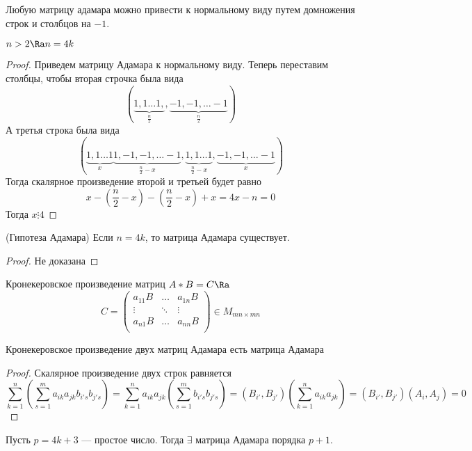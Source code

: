 \begin{note}
    Любую матрицу адамара можно привести к нормальному виду путем домножения строк и столбцов на \(-1\).
\end{note}
\begin{theorem}
    \(n > 2 \Ra n = 4k\)
\end{theorem}
\begin{proof}
    Приведем матрицу Адамара к нормальному виду. Теперь переставим столбцы, чтобы вторая строчка была вида
    \[(\underbrace{1, 1 \dots 1,}_{\frac{n}{2}}, \underbrace{-1, -1, \dots -1}_{\frac{n}{2}} )\]
    А третья строка была вида
    \[(\underbrace{1, 1 \dots 1}_{x}  \underbrace{1, -1, -1, \dots -1}_{\frac{n}{2} - x}, \underbrace{1, 1 \dots 1}_{\frac{n}{2} - x},  \underbrace{-1, -1, \dots -1}_{x} )\]
    Тогда скалярное произведение второй и третьей будет равно 
    \[x - \left(\frac{n}{2} - x\right) - \left(\frac{n}{2} - x\right) + x = 4x - n = 0\]
    Тогда \(x \vdots 4\)
\end{proof}
\begin{theorem}(Гипотеза Адамара)
    Если \(n = 4k\), то матрица Адамара существует.
\end{theorem}
\begin{proof}
    Не доказана
\end{proof}
\begin{definition}
    Кронекеровское произведение матриц \(A * B = C \Ra\)
    \[C = \left(\begin{array}{ccc}
        a_{11}B & \dots & a_{1n}B \\ 
        \vdots & \ddots & \vdots \\ 
        a_{n1}B & \dots & a_{nn}B \\ 
    \end{array}\right) \in M_{mn \times mn}\]
\end{definition}
\begin{proposition}
    Кронекеровское произведение двух матриц Адамара есть матрица Адамара
\end{proposition}
\begin{proof}
    Скалярное произведение двух строк равняется 
    \[\sum_{k = 1}^n\left(\sum_{s = 1}^m a_{ik}a_{jk}b_{i's}b_{j's}\right) = \sum_{k = 1}^na_{ik}a_{jk}\left(\sum_{s = 1}^mb_{i's}b_{j's}\right) = (B_{i'}, B_{j'})\left(\sum_{k = 1}^na_{ik}a_{jk}\right) = (B_{i'}, B_{j'})(A_i, A_j) = 0\]
\end{proof}
\begin{theorem}[Пэли]
    Пусть \(p = 4k + 3\) --- простое число. Тогда \(\exists \) матрица Адамара порядка \(p + 1\).
\end{theorem}
